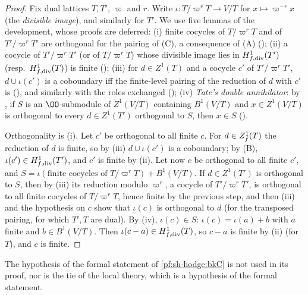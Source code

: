 \begin{proof}
Fix dual lattices $T,T'$, $\varpi$ and $r$. Write $\iota\colon T/\varpi^rT\to V/T$ for $x\mapsto\varpi^{-r}x$ (the \emph{divisible image}),
and similarly for $T'$. We use five lemmas of the development, whose proofs are deferred: (i) finite cocycles of $T/\varpi^rT$ and of
$T'/\varpi^rT'$ are orthogonal for the pairing of (C), a consequence of (A)
(); (ii) a cocycle of $T'/\varpi^rT'$ (or of $T/\varpi^rT$) whose divisible
image lies in $H^1_{f,\mathrm{div}}(T')$ (resp.\ $H^1_{f,\mathrm{div}}(T)$) is finite (); (iii) for $d\in Z^1(T)$ and a cocycle $c'$ of
$T'/\varpi^rT'$, $d\cup\iota(c')$ is a coboundary iff the finite-level pairing of the reduction of $d$ with $c'$ is
(), and similarly with the roles exchanged
(); (iv) \emph{Tate's double annihilator}: by \shhodgeLTD, if $S$ is an
$\OO$-submodule of $Z^1(V/T)$ containing $B^1(V/T)$ and $x\in Z^1(V/T)$ is orthogonal to every $d\in Z^1(T')$ orthogonal to $S$, then
$x\in S$ ().

Orthogonality is (i). Let $c'$ be orthogonal to all finite $c$. For $d\in Z^1_{f}(T)$ the reduction of $d$ is finite, so by (iii) $d\cup
\iota(c')$ is a coboundary; by (B), $\iota(c')\in H^1_{f,\mathrm{div}}(T')$, and $c'$ is finite by (ii). Let now $c$ be orthogonal to all finite $c'$, and
$S=\iota(\text{finite cocycles of }T/\varpi^rT)+B^1(V/T)$. If $d\in Z^1(T')$ is orthogonal to $S$, then by (iii) its reduction modulo
$\varpi^r$, a cocycle of $T'/\varpi^rT'$, is orthogonal to all finite cocycles of $T/\varpi^rT$, hence finite by the previous step, and then
(iii) and the hypothesis on $c$ show that $\iota(c)$ is orthogonal to $d$ (for the transposed pairing, for which $T',T$ are dual). By (iv), $\iota(c)\in S$: $\iota(c)=\iota(a)+b$ with $a$ finite and $b\in B^1(V/T)$. Then $\iota(c-a)\in H^1_{f,\mathrm{div}}(T)$, so $c-a$ is finite by
(ii) (for $T$), and $c$ is finite.
\end{proof}

\begin{remark}\label{pf:sh-hodge:bkC-rem}
The hypothesis \shhodgeLEC{} of the formal statement of \cref{pf:sh-hodge:bkC} is not used in its proof, nor is the tie of the local
theory, which is a hypothesis of the formal statement.
\end{remark}

